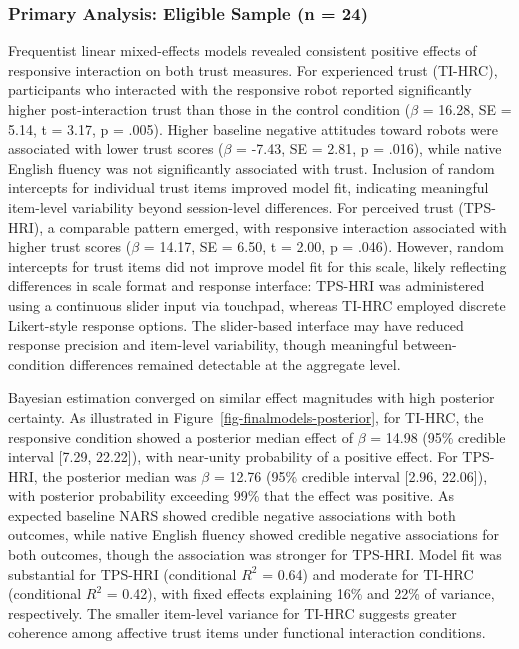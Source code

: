 \documentclass[
]{article}
\begin{document}
\subsubsection{Primary Analysis: Eligible Sample (n =
24)}\label{primary-analysis-eligible-sample-n-24}

Frequentist linear mixed-effects models revealed consistent positive
effects of responsive interaction on both trust measures. For
experienced trust (TI-HRC), participants who interacted with the
responsive robot reported significantly higher post-interaction trust
than those in the control condition (\(\beta\) = 16.28, SE = 5.14, t =
3.17, p = .005). Higher baseline negative attitudes toward robots were
associated with lower trust scores (\(\beta\) = -7.43, SE = 2.81, p =
.016), while native English fluency was not significantly associated
with trust. Inclusion of random intercepts for individual trust items
improved model fit, indicating meaningful item-level variability beyond
session-level differences. For perceived trust (TPS-HRI), a comparable
pattern emerged, with responsive interaction associated with higher
trust scores (\(\beta\) = 14.17, SE = 6.50, t = 2.00, p = .046).
However, random intercepts for trust items did not improve model fit for
this scale, likely reflecting differences in scale format and response
interface: TPS-HRI was administered using a continuous slider input via
touchpad, whereas TI-HRC employed discrete Likert-style response
options. The slider-based interface may have reduced response precision
and item-level variability, though meaningful between-condition
differences remained detectable at the aggregate level.

Bayesian estimation converged on similar effect magnitudes with high
posterior certainty. As illustrated in
Figure~\ref{fig-finalmodels-posterior}, for TI-HRC, the responsive
condition showed a posterior median effect of \(\beta\) = 14.98 (95\%
credible interval {[}7.29, 22.22{]}), with near-unity probability of a
positive effect. For TPS-HRI, the posterior median was \(\beta\) = 12.76
(95\% credible interval {[}2.96, 22.06{]}), with posterior probability
exceeding 99\% that the effect was positive. As expected baseline NARS
showed credible negative associations with both outcomes, while native
English fluency showed credible negative associations for both outcomes,
though the association was stronger for TPS-HRI. Model fit was
substantial for TPS-HRI (conditional \(R^2\) = 0.64) and moderate for
TI-HRC (conditional \(R^2\) = 0.42), with fixed effects explaining 16\%
and 22\% of variance, respectively. The smaller item-level variance for
TI-HRC suggests greater coherence among affective trust items under
functional interaction conditions.
\end{document}
